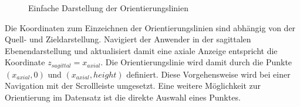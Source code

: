 \begin{figure}[htb]
\centering
{}
\caption{Einfache Darstellung der Orientierungslinien}
\label{lines:single}
\end{figure}

Die Koordinaten zum Einzeichnen der Orientierungslinien sind abhängig von der Quell- und Zieldarstellung. Navigiert der Anwender in der sagittalen Ebenendarstellung und aktualisiert damit eine axiale Anzeige entspricht die Koordinate $z_{sagittal}  = x_{axial}$. Die Orientierungslinie wird damit durch die Punkte $(x_{axial}, 0) $ und $(x_{axial}, height)$ definiert. Diese Vorgehensweise wird bei einer Navigation mit der Scrollleiste umgesetzt. Eine weitere Möglichkeit zur Orientierung im Datensatz ist die direkte Auswahl eines Punktes.

